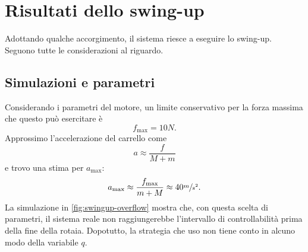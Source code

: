 \section{Risultati dello swing-up}
Adottando qualche accorgimento, il sistema riesce a eseguire lo swing-up.
Seguono tutte le considerazioni al riguardo.

\subsection{Simulazioni e parametri}
Considerando i parametri del motore, un limite conservativo
per la forza massima che questo può esercitare è
\begin{equation*}
    f_{\max} = 10N.
\end{equation*}
Approssimo l'accelerazione del carrello come
\begin{equation*}
    a \approx \frac f {M + m}
\end{equation*}
e trovo una stima per $a_{\max}$:
\begin{equation*}
    a_{\max} \approx \frac {f_{\max}}{m+M} \approx 40 \sfrac m {s^2}.
\end{equation*}
La simulazione in \autoref{fig:swingup-overflow} mostra che,
con questa scelta di parametri, il sistema
reale non raggiungerebbe
l'intervallo di controllabilità prima della fine della rotaia.
Dopotutto, la strategia che uso non tiene conto
in alcuno modo della variabile $q$.

